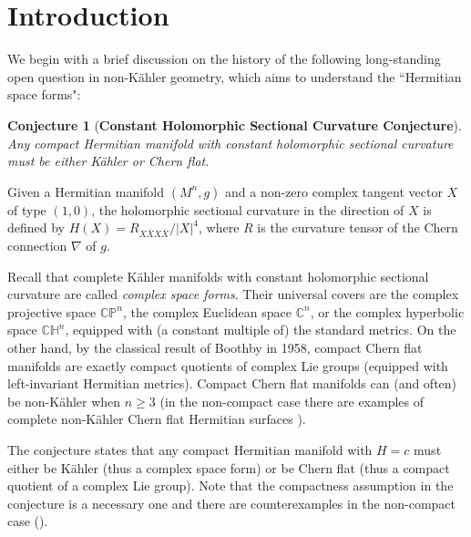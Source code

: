 \documentclass{amsart}
\newtheorem{conjecture}{Conjecture}
\begin{document}
\tableofcontents




\section{Introduction}\label{intro}

We begin with a brief discussion on the history of the following long-standing open question in non-K\"ahler geometry, which aims to understand the ``Hermitian space forms":



\begin{conjecture}[{\bf Constant Holomorphic Sectional Curvature Conjecture}] \label{conj1}
Any compact Hermitian manifold with constant holomorphic sectional curvature must be either K\"ahler or Chern flat.
\end{conjecture}

Given a Hermitian manifold $(M^n,g)$ and a non-zero complex tangent vector $X$ of type $(1,0)$, the holomorphic sectional curvature in the direction of $X$ is  defined by
$ H(X) = R_{X\bar{X}X\bar{X}}/|X|^4$,
where $R$ is the curvature tensor of the Chern connection $\nabla$ of $g$.

Recall that complete K\"ahler manifolds with constant holomorphic sectional curvature are called {\em complex space forms}. Their universal covers are the complex projective space ${\mathbb C}{\mathbb P}^n$, the complex Euclidean space ${\mathbb C}^n$, or the complex hyperbolic space ${\mathbb C}{\mathbb H}^n$, equipped with (a constant multiple of) the standard metrics. On the other hand, by the classical result of Boothby \cite{Boothby} in 1958, compact Chern flat manifolds are exactly compact quotients of complex Lie groups (equipped with left-invariant Hermitian metrics). Compact Chern flat manifolds can (and often) be non-K\"ahler when $n\geq 3$ (in the non-compact case there are examples of complete  non-K\"ahler Chern flat Hermitian surfaces \cite{YangZ}).

The conjecture states that any compact Hermitian manifold with $H=c$ must either be K\"ahler (thus a complex space form) or be Chern flat (thus a compact quotient of a complex Lie group). Note that the compactness assumption in the conjecture is a necessary one and there are counterexamples in the non-compact case (\cite{CCN}).
\end{document}

